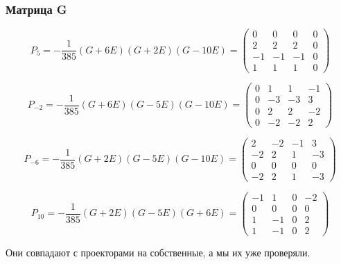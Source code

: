 \documentclass[12pt, a4paper]{article}
\begin{document}
    \subsubsection{Матрица G}

    \begin{equation}
        P_5 = -\frac{1}{385} (G + 6E) (G + 2E) (G - 10E) = \left(\begin{matrix}
            0 & 0 & 0 & 0 \\
            2 & 2 & 2 & 0 \\
            -1 & -1 & -1 & 0 \\
            1 & 1 & 1 & 0
        \end{matrix}\right)
    \end{equation}


    \begin{equation}
        P_{-2} = -\frac{1}{385} (G + 6E) (G - 5E) (G - 10E) = \left(\begin{matrix}
            0 & 1 & 1 & -1 \\
            0 & -3 & -3 & 3 \\
            0 & 2 & 2 & -2 \\
            0 & -2 & -2 & 2
        \end{matrix}\right)
    \end{equation}


    \begin{equation}
        P_{-6} = -\frac{1}{385} (G + 2E) (G - 5E) (G - 10E) = \left(\begin{matrix}
            2 & -2 & -1 & 3 \\
            -2 & 2 & 1 & -3 \\
            0 & 0 & 0 & 0 \\
            -2 & 2 & 1 & -3
        \end{matrix}\right)
    \end{equation}

    \begin{equation}
        P_{10} = -\frac{1}{385} (G + 2E) (G - 5E) (G + 6E) = \left(\begin{matrix}
            -1 & 1 & 0 & -2 \\
            0 & 0 & 0 & 0 \\
            1 & -1 & 0 & 2 \\
            1 & -1 & 0 & 2
        \end{matrix}\right)
    \end{equation}


    Они совпадают с проекторами на собственные, а мы их уже проверяли.
\end{document}
